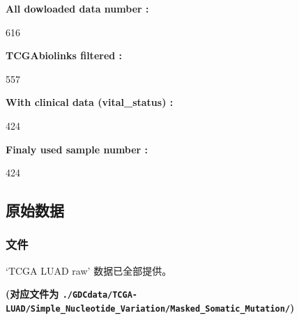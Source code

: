 \documentclass[
]{article}
\begin{document}
\begin{center}\begin{tcolorbox}[colback=gray!10, colframe=gray!50, width=0.9\linewidth, arc=1mm, boxrule=0.5pt]
\textbf{
All dowloaded data number
:}

\vspace{0.5em}

    616

\vspace{2em}


\textbf{
TCGAbiolinks filtered
:}

\vspace{0.5em}

    557

\vspace{2em}


\textbf{
With clinical data (vital\_status)
:}

\vspace{0.5em}

    424

\vspace{2em}


\textbf{
Finaly used sample number
:}

\vspace{0.5em}

    424

\vspace{2em}
\end{tcolorbox}
\end{center}

\hypertarget{ux539fux59cbux6570ux636e}{%
\subsection{原始数据}\label{ux539fux59cbux6570ux636e}}

\hypertarget{ux6587ux4ef6}{%
\subsubsection{文件}\label{ux6587ux4ef6}}

`TCGA LUAD raw' 数据已全部提供。

\textbf{(对应文件为 \texttt{./GDCdata/TCGA-LUAD/Simple\_Nucleotide\_Variation/Masked\_Somatic\_Mutation/})}
\end{document}
